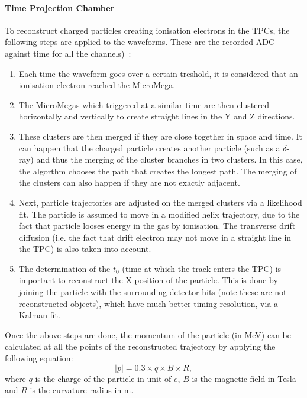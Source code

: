 \paragraph{Time Projection Chamber}
\label{subparc:tpcreco}
To reconstruct charged particles creating ionisation electrons in the
\Glspl{TPC}, the following steps are applied to the waveforms. These
are the recorded \Gls{ADC} against time for all the
channels)~\cite{TN072}:
\begin{enumerate}[noitemsep,topsep=0pt]
\item Each time the waveform goes over a certain treshold, it is
  considered that an ionisation electron reached the MicroMega.
\item The MicroMegas which triggered at a similar time are then
  clustered horizontally and vertically to create straight lines in
  the Y and Z directions.
\item These clusters are then merged if they are close together in
  space and time. It can happen that the charged particle creates
  another particle (such as a $\delta$-ray) and thus the merging of
  the cluster branches in two clusters. In this case, the algorthm
  chooses the path that creates the longest path. The merging of the
  clusters can also happen if they are not exactly adjacent.
\item Next, particle trajectories are adjusted on the merged clusters
  via a likelihood fit. The particle is assumed to move in a modified
  helix trajectory, due to the fact that particle looses energy in the
  gas by ionisation. The transverse drift diffusion (i.e. the fact
  that drift electron may not move in a straight line in the
  \Gls{TPC}) is also taken into account.
\item The determination of the $t_0$ (time at which the track enters
  the \Gls{TPC}) is important to reconstruct the X position of the
  particle. This is done by joining the particle with the surrounding
  detector hits (note these are not reconstructed objects), which have
  much better timing resolution, via a Kalman fit.
\end{enumerate}

Once the above steps are done, the momentum of the particle (in MeV)
can be calculated at all the points of the reconstructed trajectory by
applying the following equation:
\begin{equation}
  \label{eq:momentumtpc}
  |p| = 0.3 \times q \times B \times R,
\end{equation}
where $q$ is the charge of the particle in unit of $e$, $B$ is the
magnetic field in Tesla and $R$ is the curvature radius in m.

